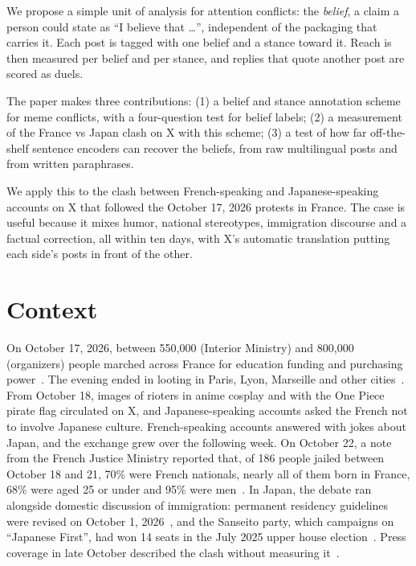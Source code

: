 \documentclass[10pt,a4paper]{article}
\begin{document}
We propose a simple unit of analysis for attention conflicts: the \emph{belief}, a claim a person could state as ``I believe that \ldots'', independent of the packaging that carries it. Each post is tagged with one belief and a stance toward it. Reach is then measured per belief and per stance, and replies that quote another post are scored as duels.

The paper makes three contributions: (1) a belief and stance annotation scheme for meme conflicts, with a four-question test for belief labels; (2) a measurement of the France vs Japan clash on X with this scheme; (3) a test of how far off-the-shelf sentence encoders can recover the beliefs, from raw multilingual posts and from written paraphrases.

We apply this to the clash between French-speaking and Japanese-speaking accounts on X that followed the October 17, 2026 protests in France. The case is useful because it mixes humor, national stereotypes, immigration discourse and a factual correction, all within ten days, with X's automatic translation putting each side's posts in front of the other.

\section{Context}
On October 17, 2026, between 550,000 (Interior Ministry) and 800,000 (organizers) people marched across France for education funding and purchasing power~\cite{franceinfo,wiki}. The evening ended in looting in Paris, Lyon, Marseille and other cities~\cite{wiki}. From October 18, images of rioters in anime cosplay and with the One Piece pirate flag circulated on X, and Japanese-speaking accounts asked the French not to involve Japanese culture. French-speaking accounts answered with jokes about Japan, and the exchange grew over the following week. On October 22, a note from the French Justice Ministry reported that, of 186 people jailed between October 18 and 21, 70\% were French nationals, nearly all of them born in France, 68\% were aged 25 or under and 95\% were men~\cite{france24}. In Japan, the debate ran alongside domestic discussion of immigration: permanent residency guidelines were revised on October 1, 2026~\cite{nippon}, and the Sanseito party, which campaigns on ``Japanese First'', had won 14 seats in the July 2025 upper house election~\cite{mashable}. Press coverage in late October described the clash without measuring it~\cite{mashable,vingt}.
\end{document}
